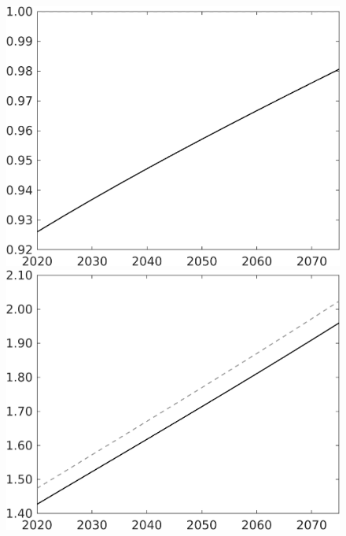 \documentclass[12pt]{article}
\begin{document}
\begin{figure}[h!!]
\begin{minipage}[]{0.32\textwidth}
\end{minipage}	
	\begin{minipage}[]{0.32\textwidth}
		\includegraphics[width=1\textwidth]{../../codding_model/own_basedOnFried/optimalPol_010922_revision/figures/all_13Sept22/CompTaul_LFBAU_Reg0_lambdaa_spillover0_nsk0_xgr1_knspil1_sep1_countec0_GovRev0_etaa0.79_lgd0.png}
	\end{minipage}	
\begin{minipage}[]{0.32\textwidth}
\includegraphics[width=1\textwidth]{../../codding_model/own_basedOnFried/optimalPol_010922_revision/figures/all_13Sept22/CompTaul_LFBAU_Reg0_wl_spillover0_nsk0_xgr1_knspil1_sep1_countec0_GovRev0_etaa0.79_lgd0.png}

\end{minipage}
\end{figure}
\end{document}
